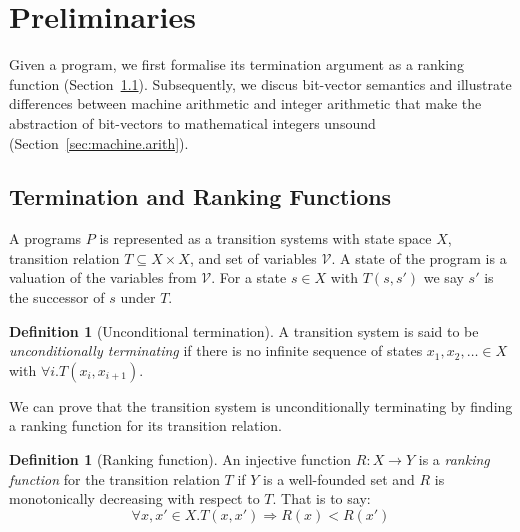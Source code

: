 \documentclass[preprint]{sigplanconf}
\theoremstyle{definition}
\newtheorem{definition}[theorem]{Definition}
\begin{document}


\section{Preliminaries}
Given a program, %
we first formalise its termination argument as a ranking function (Section~\ref{sec:ranking.functions}). 
Subsequently, we discus bit-vector semantics and illustrate 
differences between machine arithmetic and integer arithmetic that
make the abstraction of bit-vectors to mathematical integers unsound (Section~\ref{sec:machine.arith}).

\subsection{Termination and Ranking Functions} \label{sec:ranking.functions}
A programs $P$ is represented as a transition systems with state space $X$, transition relation $T \subseteq X \times X$, and set of variables $\mathcal{V}$. 
A state of the program is a valuation of the variables from $\mathcal{V}$. For a state $s \in X$ with $T(s,s')$ we say $s'$
is the successor of $s$ under $T$. 

\begin{definition}[Unconditional termination]
A transition system is said to be \emph{unconditionally terminating} if there is no infinite sequence of states
$x_1, x_2, \ldots \in X$ with $\forall i . T(x_i, x_{i+1})$.  
\end{definition}

We can prove that the transition system is unconditionally terminating by finding a ranking function for its transition relation.

\begin{definition}[Ranking function]
An injective function ${R:X\to Y}$ is a \emph{ranking function} for the transition relation $T$ if $Y$ is a well-founded set and 
$R$ is monotonically decreasing with respect to $T$.  That is
to say:
$$\forall x, x' \in X. T(x, x') \Rightarrow R(x) < R(x')$$
\end{definition}
\end{document}
